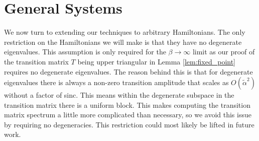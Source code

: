 \documentclass{article}
\newcommand{\bigo}[1]{O\left(#1\right)}
\begin{document}


\section{General Systems} \label{sec:general_systems}

We now turn to extending our techniques to arbitrary Hamiltonians. The only restriction on the Hamiltonians we will make is that they have no degenerate eigenvalues. This assumption is only required for the $\beta \to \infty$ limit as our proof of the transition matrix $T$ being upper triangular in Lemma \ref{lem:fixed_point} requires no degenerate eigenvalues. The reason behind this is that for degenerate eigenvalues there is always a non-zero transition amplitude that scales as $\bigo{\widetilde{\alpha}^2}$ without a factor of sinc. This means within the degenerate subspace in the transition matrix there is a uniform block. This makes computing the transition matrix spectrum a little more complicated than necessary, so we avoid this issue by requiring no degeneracies. This restriction could most likely be lifted in future work. 
\end{document}
